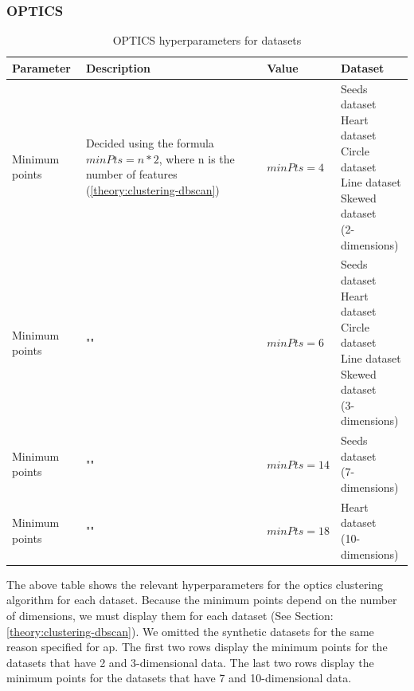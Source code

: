 \subsubsection{OPTICS}

\begin{table}[h]
      \begin{tabular}{|l|p{6cm}|l|l|}
            \hline
            Parameter      & Description                                                                                                    & Value       & Dataset                    \\
            \hline
            Minimum points & Decided using the formula $minPts = n * 2$, where n is the number of features (\ref{theory:clustering-dbscan}) & $minPts=4$  & \makecell[l]{Seeds dataset \\ Heart dataset \\ Circle dataset \\ Line dataset \\ Skewed dataset \\ (2-dimensions)}  \\
            \hline
            Minimum points & ""                                                                                                             & $minPts=6$  & \makecell[l]{Seeds dataset \\ Heart dataset \\ Circle dataset \\ Line dataset \\ Skewed dataset \\ (3-dimensions)} \\
            \hline
            Minimum points & ""                                                                                                             & $minPts=14$ & \makecell[l]{Seeds dataset \\ (7-dimensions)}  \\
            \hline
            Minimum points & ""                                                                                                             & $minPts=18$ & \makecell[l]{Heart dataset \\ (10-dimensions)} \\
            \hline
      \end{tabular}
      \caption{OPTICS  hyperparameters for datasets}
      \label{tab:dbscan-formula-sklearn}
\end{table}
The above table shows the relevant hyperparameters for the \gls{optics} clustering algorithm for each dataset.
Because the minimum points depend on the number of dimensions, we must display them for each dataset (See Section: \ref{theory:clustering-dbscan}).
We omitted the synthetic datasets for the same reason specified for \gls{ap}.
The first two rows display the minimum points for the datasets that have 2 and 3-dimensional data.
The last two rows display the minimum points for the datasets that have 7 and 10-dimensional data.
\newpage
